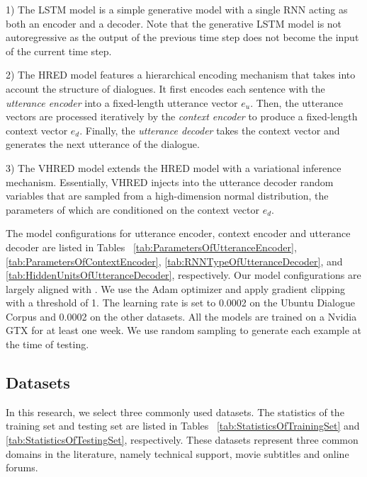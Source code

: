 \documentclass[conference]{IEEEtran}
\begin{document}
1) The LSTM model is a simple generative model with a single RNN acting as both an encoder and a decoder.
Note that the generative LSTM model is not autoregressive as the output of the previous time step does not become the input of the current time step.

2) The HRED model \cite{hred-qs,HRED} features a hierarchical encoding mechanism that takes into account the structure of dialogues.
It first encodes each sentence with the \emph{utterance encoder} into a fixed-length utterance vector $e_u$. Then, the utterance vectors are processed iteratively by the \emph{context encoder} to produce a fixed-length context vector $e_d$.
Finally, the \emph{utterance decoder} takes the context vector and generates the next utterance of the dialogue.

3) The VHRED model \cite{VHRED} extends the HRED model with a variational inference mechanism.
Essentially, VHRED injects into the utterance decoder random variables that are sampled from a high-dimension normal distribution, the parameters of which are conditioned on the context vector $e_d$.

The model configurations for utterance encoder, context encoder and utterance decoder are listed in Tables~
\ref{tab:ParametersOfUtteranceEncoder},
\ref{tab:ParametersOfContextEncoder},
\ref{tab:RNNTypeOfUtteranceDecoder}, and
\ref{tab:HiddenUnitsOfUtteranceDecoder},
respectively.
Our model configurations are largely aligned with \cite{VHRED}.
We use the Adam optimizer \cite{AdamOpt} and apply gradient clipping with a threshold of 1.
The learning rate is set to 0.0002 on the Ubuntu Dialogue Corpus and 0.0002 on the other datasets.
All the models are trained on a Nvidia GTX for at least one week.
We use random sampling to generate each example at the time of testing.


\subsection{Datasets}
In this research, we select three commonly used datasets.
The statistics of the training set and testing set are listed in Tables~
\ref{tab:StatisticsOfTrainingSet} and
\ref{tab:StatisticsOfTestingSet}, respectively.
These datasets represent three common domains in the literature, namely technical support, movie subtitles and online forums.

\end{document}

